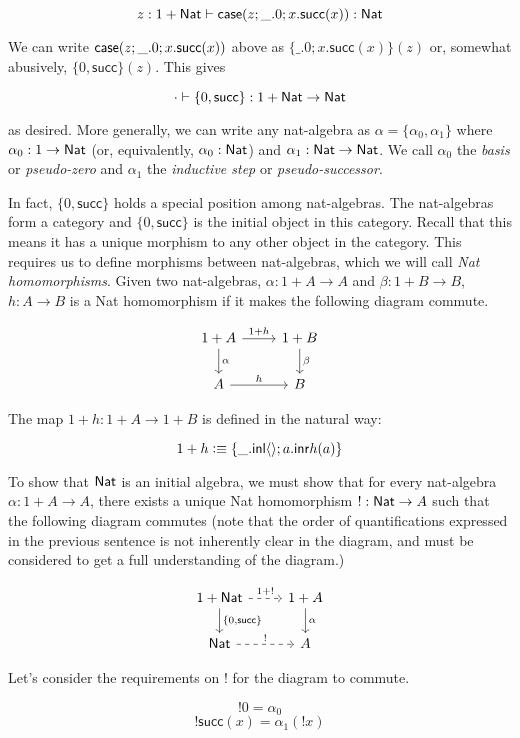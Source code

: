 \documentclass[11pt]{article}
\newcommand*{\z}{0}
\newcommand*{\s}{\mathsf{succ}}
\newcommand*{\dummy}{\_}
\newcommand*{\triv}{\langle \rangle}
\begin{document}
\[z: 1 + \Nat \entails \case(z; \dummy. \z; x. \s(x)) : \Nat\]

We can write $\case(z; \dummy. \z; x. \s(x))$
above as $\{\dummy. \z; x. \s(x)\}(z)$ or, somewhat abusively,
$\{\z, \s\}(z)$. This gives

\[\cdot \entails \{\z, \s\} : 1 + \Nat \to \Nat\]

as desired. More generally, we can write any nat-algebra as
$\alpha = \{\alpha_0, \alpha_1\}$ where $\alpha_0 : 1 \to \mathsf{Nat}$ (or,
equivalently, $\alpha_0 : \mathsf{Nat}$) and $\alpha_1: \mathsf{Nat} \to \mathsf{Nat}$. We call
$\alpha_0$ the {\em basis} or {\em pseudo-zero} and $\alpha_1$ the
{\em inductive step} or {\em pseudo-successor}.

In fact, $\{\z, \s\}$ holds a special position among nat-algebras.
The nat-algebras form a category and $\{\z, \s\}$ is the initial object
in this category. Recall that this means it has a unique morphism to any other
object in the category. This requires us to define morphisms between
nat-algebras, which we will call {\em Nat homomorphisms}. Given two
nat-algebras, $\alpha : 1 + A \to A$ and $\beta: 1 + B \to B$,
$h: A \to B$ is a Nat homomorphism if it makes the following diagram commute.

\[
\begin{tikzcd}
1+A \arrow{d}{\alpha} \arrow{r}{1+h} & 1+B \arrow{d}{\beta}\\
A \arrow{r}{h} & B
\end{tikzcd}
\]

The map $1 + h: 1 + A \to 1 + B$ is defined in the natural way:

\[1 + h \defeq \{\dummy. \inl \triv; a. \inr h(a)\}\]

To show that $\mathsf{Nat}$ is an initial algebra, we must show that for every
nat-algebra
$\alpha: 1 + A \to A$, there exists a unique Nat homomorphism $!: \mathsf{Nat} \to A$
such that the following diagram commutes (note that the order of
quantifications expressed in the previous sentence is not inherently clear in
the diagram, and must be considered to get a full understanding of the
diagram.)

\[
\begin{tikzcd}
1+\Nat \arrow{d}{\{\z, \s\}} \arrow[dashed]{r}{1+!} & 1+A \arrow{d}{\alpha}\\
\Nat \arrow[dashed]{r}{!} & A
\end{tikzcd}
\]

Let's consider the requirements on $!$ for the diagram to commute.

\[! \z = \alpha_0 \]
\[! \s(x) = \alpha_1(! x)\]
\end{document}
